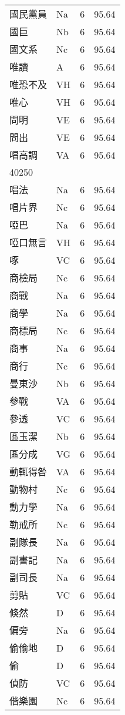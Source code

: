 \documentclass[twocolumn]{book}
\begin{document}
\begin{supertabular}{llrr}
國民黨員 & Na & 6 &  95.64\\
國巨 & Nb & 6 &  95.64\\
國文系 & Nc & 6 &  95.64\\
唯讀 & A & 6 &  95.64\\
唯恐不及 & VH & 6 &  95.64\\
唯心 & VH & 6 &  95.64\\
問明 & VE & 6 &  95.64\\
問出 & VE & 6 &  95.64\\
唱高調 & VA & 6 &  95.64\\
40250\\
唱法 & Na & 6 &  95.64\\
唱片界 & Nc & 6 &  95.64\\
啞巴 & Na & 6 &  95.64\\
啞口無言 & VH & 6 &  95.64\\
啄 & VC & 6 &  95.64\\
商檢局 & Nc & 6 &  95.64\\
商戰 & Na & 6 &  95.64\\
商學 & Na & 6 &  95.64\\
商標局 & Nc & 6 &  95.64\\
商事 & Na & 6 &  95.64\\
商行 & Nc & 6 &  95.64\\
曼東沙 & Nb & 6 &  95.64\\
參戰 & VA & 6 &  95.64\\
參透 & VC & 6 &  95.64\\
區玉潔 & Nb & 6 &  95.64\\
區分成 & VG & 6 &  95.64\\
動輒得咎 & VA & 6 &  95.64\\
動物村 & Nc & 6 &  95.64\\
動力學 & Na & 6 &  95.64\\
勒戒所 & Nc & 6 &  95.64\\
副隊長 & Na & 6 &  95.64\\
副書記 & Na & 6 &  95.64\\
副司長 & Na & 6 &  95.64\\
剪貼 & VC & 6 &  95.64\\
倏然 & D & 6 &  95.64\\
偏旁 & Na & 6 &  95.64\\
偷偷地 & D & 6 &  95.64\\
偷 & D & 6 &  95.64\\
偵防 & VC & 6 &  95.64\\
偕樂園 & Nc & 6 &  95.64\\

\end{supertabular}
\end{document}
